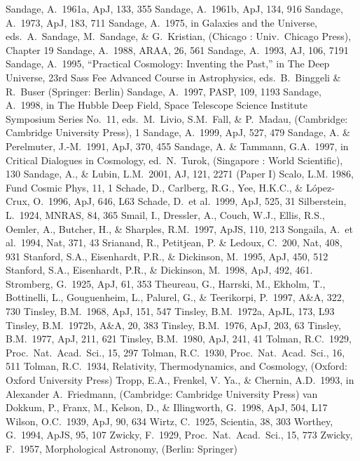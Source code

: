 \documentclass[preprint]{aastex}
\begin{document}
\begin{thebibliography}{}
\bibitem[]{}Sandage, A.\ 1961a, ApJ, 133, 355
\bibitem[]{}Sandage, A.\ 1961b, ApJ, 134, 916
\bibitem[]{}Sandage, A.\ 1973, ApJ, 183, 711
\bibitem[]{}Sandage, A.\ 1975, in Galaxies and the Universe, eds.\ A.\
Sandage, M.\ Sandage, \& G.\ Kristian, (Chicago : Univ.\ Chicago
Press), Chapter 19
\bibitem[]{}Sandage, A.\ 1988, ARAA, 26, 561 
\bibitem[]{}Sandage, A.\ 1993, AJ, 106, 7191
\bibitem[]{}Sandage, A.\ 1995, ``Practical Cosmology: Inventing the
Past,'' in The Deep Universe, 23rd Sass Fee Advanced Course in
Astrophysics, eds.\ B.\ Binggeli \& R.\ Buser (Springer: Berlin)
\bibitem[]{}Sandage, A.\ 1997, PASP, 109, 1193
\bibitem[]{}Sandage, A.\ 1998, in The Hubble Deep Field, Space
Telescope Science Institute Symposium Series No.\ 11, eds.\ M.\ Livio,
S.M.\ Fall, \& P.\ Madau, (Cambridge: Cambridge University Press), 1
\bibitem[]{}Sandage, A.\ 1999, ApJ, 527, 479
\bibitem[]{}Sandage, A. \& Perelmuter, J.-M.\ 1991, ApJ, 370, 455
\bibitem[]{}Sandage, A. \& Tammann, G.A.\ 1997, in Critical Dialogues
in Cosmology, ed.\ N.\ Turok, (Singapore : World Scientific), 130
\bibitem[]{}Sandage, A., \& Lubin, L.M.\ 2001, AJ, 121, 2271 (Paper I)
\bibitem[]{}Scalo, L.M. 1986, Fund Cosmic Phys, 11, 1
\bibitem[]{}Schade, D., Carlberg, R.G., Yee, H.K.C., \& L\'opez-Crux,
O.\ 1996, ApJ, 646, L63
\bibitem[]{} Schade, D.\ et al.\ 1999, ApJ, 525, 31
\bibitem[]{}Silberstein, L.\ 1924, MNRAS, 84, 365
\bibitem[]{}Smail, I., Dressler, A., Couch, W.J., Ellis, R.S., Oemler,
A., Butcher, H., \& Sharples, R.M.\ 1997, ApJS, 110, 213
\bibitem[]{}Songaila, A.\ et al.\ 1994, Nat, 371, 43
\bibitem[]{}Srianand, R., Petitjean, P. \& Ledoux, C.\ 200, Nat, 408,
931
\bibitem[]{}Stanford, S.A., Eisenhardt, P.R., \& Dickinson, M.\ 1995,
ApJ, 450, 512
\bibitem[]{}Stanford, S.A., Eisenhardt, P.R., \& Dickinson, M.\ 1998,
ApJ, 492, 461.
\bibitem[]{}Stromberg, G.\ 1925, ApJ, 61, 353
\bibitem[]{}Theureau, G., Harrski, M., Ekholm, T., Bottinelli, L.,
Gouguenheim, L., Palurel, G., \& Teerikorpi, P.\ 1997, A\&A, 322, 730
\bibitem[]{}Tinsley, B.M.\ 1968, ApJ, 151, 547 
\bibitem[]{}Tinsley, B.M.\ 1972a, ApJL, 173, L93
\bibitem[]{}Tinsley, B.M.\ 1972b, A\&A, 20, 383
\bibitem[]{}Tinsley, B.M.\ 1976, ApJ, 203, 63
\bibitem[]{}Tinsley, B.M.\ 1977, ApJ, 211, 621
\bibitem[]{}Tinsley, B.M.\ 1980, ApJ, 241, 41
\bibitem[]{}Tolman, R.C.\ 1929, Proc.\ Nat.\ Acad.\ Sci., 15, 297  
\bibitem[]{}Tolman, R.C.\ 1930, Proc.\ Nat.\ Acad.\ Sci., 16, 511  
\bibitem[]{}Tolman, R.C.\ 1934, Relativity, Thermodynamics, and
Cosmology, (Oxford: Oxford University Press)
\bibitem[]{}Tropp, E.A., Frenkel, V. Ya., \& Chernin, A.D.\ 1993, in
Alexander A.\ Friedmann, (Cambridge: Cambridge University Press)
\bibitem[]{} van Dokkum, P., Franx, M., Kelson, D., \& Illingworth,
G.\ 1998, ApJ, 504, L17
\bibitem[]{}Wilson, O.C.\ 1939, ApJ, 90, 634
\bibitem[]{}Wirtz, C.\ 1925, Scientia, 38, 303
\bibitem[]{}Worthey, G.\ 1994, ApJS, 95, 107
\bibitem[]{}Zwicky, F.\ 1929, Proc.\ Nat.\ Acad.\ Sci., 15, 773 
\bibitem[]{}Zwicky, F.\ 1957, Morphological Astronomy, (Berlin: Springer)
\end{thebibliography}
\end{document}
